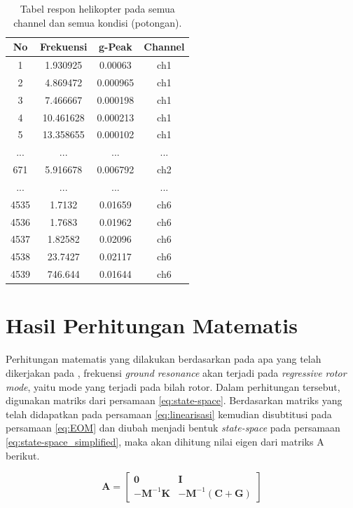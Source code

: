 \begin{table}[h]
	\centering
	\caption{Tabel respon helikopter pada semua channel dan semua kondisi (potongan).}
	\label{tb:list_all_data_sort}
		\begin{tabular}{|c|c|c|c|}
			\hline
			No & Frekuensi & g-Peak & Channel \\ \hline
			1 & 1.930925 & 0.00063 & ch1 \\ \hline
			2 & 4.869472 & 0.000965 & ch1 \\ \hline
			3 & 7.466667 & 0.000198 & ch1 \\ \hline
			4 & 10.461628 & 0.000213 & ch1 \\ \hline
			5 & 13.358655 & 0.000102 & ch1 \\ \hline
			... & ... & ... & ... \\ \hline
			671 & 5.916678 & 0.006792 & ch2 \\ \hline
			... & ... & ... & ... \\ \hline
			4535 & 1.7132 & 0.01659 & ch6 \\ \hline
			4536 & 1.7683 & 0.01962 & ch6 \\ \hline
			4537 & 1.82582 & 0.02096 & ch6 \\ \hline
			4538 & 23.7427 & 0.02117 & ch6 \\ \hline
			4539 & 746.644 & 0.01644 & ch6 \\ \hline
		\end{tabular}%
\end{table}

\section{Hasil Perhitungan Matematis}

Perhitungan matematis yang dilakukan berdasarkan pada apa yang telah dikerjakan pada \cite{BERGEOT201672}, frekuensi \textit{ground resonance} akan terjadi pada \textit{regressive rotor mode}, yaitu mode yang terjadi pada bilah rotor. Dalam perhitungan tersebut, digunakan matriks dari persamaan \ref{eq:state-space}. Berdasarkan matriks yang telah didapatkan pada persamaan \ref{eq:linearisasi} kemudian disubtitusi pada persamaan \ref{eq:EOM} dan diubah menjadi bentuk \textit{state-space} pada persamaan \ref{eq:state-space_simplified}, maka akan dihitung nilai eigen dari matriks A berikut.

\begin{equation}
	\mathbf{A}=\begin{bmatrix}
	\mathbf{0}& \mathbf{I}\\
	\mathbf{-M}^{-1}\mathbf{K}& \mathbf{-M}^{-1}(\mathbf{C}+\mathbf{G})
	\end{bmatrix}
\end{equation}

